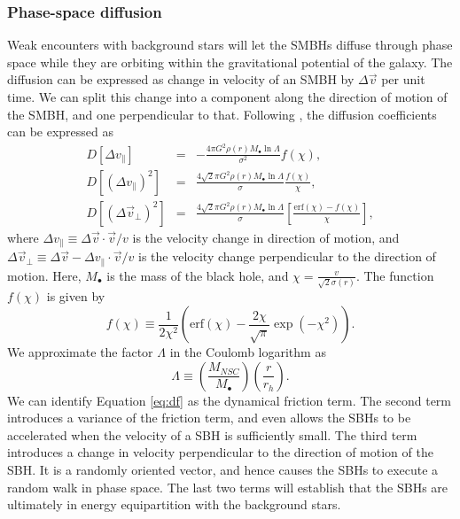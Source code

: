 \documentclass[english, apj]{emulateapj}
\begin{document}
\subsubsection{Phase-space diffusion} \label{psd}
Weak encounters with background stars will let the SMBHs diffuse through phase space while they are orbiting within the gravitational potential of the galaxy. The diffusion can be expressed as change in velocity of an SMBH by $\Delta \vec{v}$ per unit time. We can split this change into a component along the direction of motion of the SMBH, and one perpendicular to that. Following \citet{2008gady.book.....B}, the diffusion coefficients can be expressed as 
\begin{eqnarray}\label{eq:df}
D[\Delta v_\parallel] & = & -\frac{4\pi G^2\rho(r)M_\bullet\ln\Lambda}{\sigma^2}f(\chi),\\
D[(\Delta v_\parallel)^2] & = & \frac{4\sqrt{2}\pi G^2\rho(r)M_\bullet\ln\Lambda}{\sigma}\frac{f(\chi)}{\chi},\\
D[(\Delta \vec{v}_\bot)^2] & = & \frac{4\sqrt{2}\pi G^2\rho(r)M_\bullet\ln\Lambda}{\sigma}\left[\frac{\mbox{erf}(\chi)-f(\chi)}{\chi}\right],
\end{eqnarray} 
where $\Delta v_\parallel \equiv \Delta \vec{v}\cdot\vec{v}/v$ is the velocity change in direction of motion, and $\Delta \vec{v}_\bot \equiv \Delta \vec{v} - \Delta v_\parallel \cdot\vec{v}/v$ is the velocity change perpendicular to the direction of motion. Here, $M_\bullet$ is the mass of the black hole, and $\chi = \frac{v}{\sqrt{2}\sigma(r)}$. The function $f(\chi)$ is given by 
\begin{equation}
f(\chi) \equiv \frac{1}{2\chi^2}\left(\mbox{erf}(\chi)-\frac{2\chi}{\sqrt{\pi}}\exp\left(-\chi^2\right)\right).
\end{equation}
We approximate the factor $\Lambda$ in the Coulomb logarithm as
\begin{equation}
\Lambda \equiv \left(\frac{M_{NSC}}{M_\bullet}\right)\left(\frac{r}{r_h}\right).
\end{equation}
We can identify Equation \ref{eq:df} as the dynamical friction term. The second term introduces a variance of the friction term, and even allows the SBHs to be accelerated when the velocity of a SBH is sufficiently small. The third term introduces a change in velocity perpendicular to the direction of motion of the SBH. It is a randomly oriented vector, and hence causes the SBHs to execute a random walk in phase space. The last two terms will establish that the SBHs are ultimately in energy equipartition with the background stars.
\end{document}
